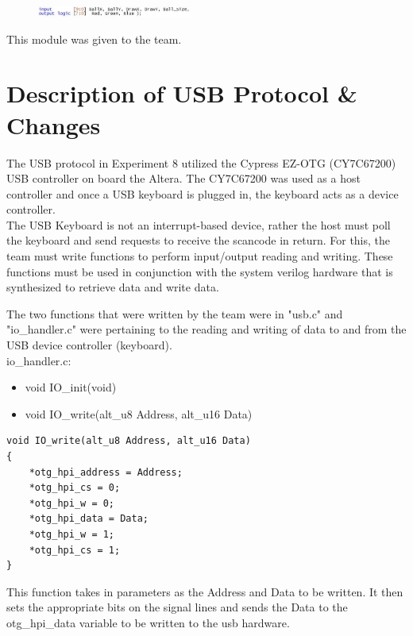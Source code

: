 \documentclass[journal, twocolumn, final,11pt,letterpaper]{IEEEtran}
\begin{document}
\begin{figure}[h]
	\centering
	\includegraphics[width=0.45\textwidth]{colorio.jpg}
	\label{fig:colorio}
	\end{figure}

This module was given to the team. \\



\section{Description of USB Protocol \& Changes}
The USB protocol in Experiment 8 utilized the Cypress EZ-OTG (CY7C67200) USB controller on board the Altera. The CY7C67200 was used as a host controller and once a USB keyboard is plugged in, the keyboard acts as a device controller.\\

The USB Keyboard is not an interrupt-based device, rather the host must poll the keyboard and send requests to receive the scancode in return. For this, the team must write functions to perform input/output reading and writing. These functions must be used in conjunction with the system verilog hardware that is synthesized to retrieve data and write data. 

The two functions that were written by the team were in "usb.c" and "io\_handler.c" were pertaining to the reading and writing of data to and from the USB device controller (keyboard).\\

io\_handler.c:
\begin{itemize}
	\item 	void IO\_init(void)
	\item 	void IO\_write(alt\_u8 Address, alt\_u16 Data)
\end{itemize}


\begin{lstlisting}
void IO_write(alt_u8 Address, alt_u16 Data)
{
	*otg_hpi_address = Address;
	*otg_hpi_cs = 0;
	*otg_hpi_w = 0;
	*otg_hpi_data = Data;
	*otg_hpi_w = 1;
	*otg_hpi_cs = 1;
}
\end{lstlisting}
This function takes in parameters as the Address and Data to be written. It then sets the appropriate bits on the signal lines and sends the Data to the otg\_hpi\_data variable to be written to the usb hardware.\\ 
\end{document}

